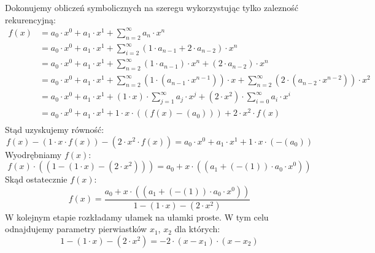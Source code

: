 \documentclass[12pt]{article}
\begin{document}
\noindent Dokonujemy obliczeń symbolicznych na szeregu wykorzystując tylko zalezność rekurencyjną:
\begin{equation}
\begin{split}
f(x)  &= {{a}}_{{0}}\cdot{x}^ {{0}} + {{a}}_{{1}}\cdot{x}^ {{1}} + \sum_{{n} = {2}}^{{\infty}}{{a}}_{{n}}\cdot{x}^ {{n}}\\ 
     & = {{a}}_{{0}}\cdot{x}^ {{0}} + {{a}}_{{1}}\cdot{x}^ {{1}} + \sum_{{i} = {2}}^{{\infty}}({1}\cdot{{a}}_{{n-1}} + {2}\cdot{{a}}_{{n-2}})\cdot{x}^ {{n}}\\ 
     & = {{a}}_{{0}}\cdot{x}^ {{0}} + {{a}}_{{1}}\cdot{x}^ {{1}} + \sum_{{n} = {2}}^{{\infty}}({1}\cdot{{a}}_{{n-1}})\cdot{x}^ {{n}} + ({2}\cdot{{a}}_{{n-2}})\cdot{x}^ {{n}}\\ 
     & = {{a}}_{{0}}\cdot{x}^ {{0}} + {{a}}_{{1}}\cdot{x}^ {{1}} + \sum_{{n} = {2}}^{{\infty}}({1}\cdot({{a}}_{{n-1}}\cdot{x}^ {{n-1}}))\cdot{x} + \sum_{{n} = {2}}^{{\infty}}({2}\cdot({{a}}_{{n-2}}\cdot{x}^ {{n-2}}))\cdot{x}^ {{2}}\\ 
     & = {{a}}_{{0}}\cdot{x}^ {{0}} + {{a}}_{{1}}\cdot{x}^ {{1}} + ({1}\cdot{x})\cdot\sum_{{j} = {1}}^{{\infty}}{{a}}_{{j}}\cdot{x}^ {{j}} + ({2}\cdot{x}^ {{2}})\cdot\sum_{{i} = {0}}^{{\infty}}{{a}}_{{i}}\cdot{x}^ {{i }}\\ 
     & = {{a}}_{{0}}\cdot{x}^ {{0}} + {{a}}_{{1}}\cdot{x}^ {{1}} + {1}\cdot{x}\cdot(({f(x)}- ( {{a}}_{{0}} ) )) + {2}\cdot{x}^ {{2}}\cdot{f(x)}\\ 
\end{split}
\end{equation}
\noindent Stąd uzyskujemy równość:
\begin{equation}
{f(x)}- ( {1}\cdot{x}\cdot{f(x)} ) - ( {2}\cdot{x}^ {{2}}\cdot{f(x)} ) =  {{a}}_{{0}}\cdot{x}^ {{0}} + {{a}}_{{1}}\cdot{x}^ {{1}} + {1}\cdot{x}\cdot(- ( {{a}}_{{0}} ) )\end{equation}
Wyodrębniamy $f(x)$:
\begin{equation}
{f(x)}\cdot(({1}- ( {1}\cdot{x} ) - ( {2}\cdot{x}^ {{2}} ) )) = {{a}}_{{0}} + {x}\cdot(({{a}}_{{1}} + (- ( {1} ) )\cdot{{a}}_{{0}}\cdot{x}^ {{0}}))\end{equation}
Skąd ostatecznie $f(x)$:
\begin{equation}
f(x) =    \frac{{{a}}_{{0}} + {x}\cdot(({{a}}_{{1}} + (- ( {1} ) )\cdot{{a}}_{{0}}\cdot{x}^ {{0}}))}{{1}- ( {1}\cdot{x} ) - ( {2}\cdot{x}^ {{2}} ) }
\end{equation}
W kolejnym etapie rozkładamy ułamek na ułamki proste.
W tym celu odnajdujemy parametry pierwiastków $x_1$, $x_2$ dla których:\begin{equation}
{1}- ( {1}\cdot{x} ) - ( {2}\cdot{x}^ {{2}} ) = -{2}\cdot (x-x_1)\cdot(x-x_2)\end{equation}
\end{document}
